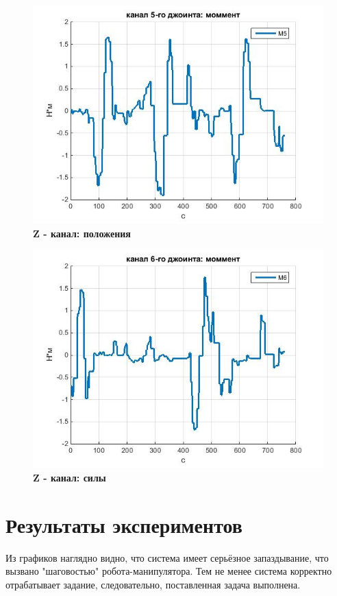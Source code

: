 \documentclass[a4paper,14pt,russian]{extreport} \usepackage{extsizes}
\begin{document}
	\begin{figure}[h]
		\centering		 
		\includegraphics[width=5.5in]{./graph/m5.jpg}	
		\caption{
			\textbf{Z - канал: положения}
		}
		\label{fig_img55}
	\end{figure}
	\begin{figure}[h]
		\centering		 
		\includegraphics[width=5.5in]{./graph/m6.jpg}	
		\caption{
			\textbf{Z - канал: силы}
		}
		\label{fig_img56}
	\end{figure}
	\section{Результаты экспериментов}
	Из графиков наглядно видно, что система имеет серьёзное запаздывание, что вызвано "шаговостью" робота-манипулятора. 
	Тем не менее система корректно отрабатывает задание, следовательно, поставленная задача выполнена.
\end{document}
